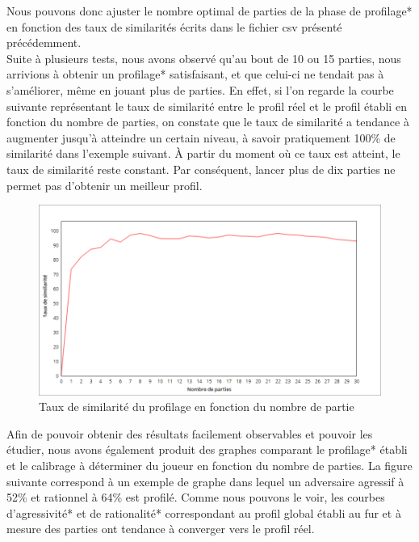 \documentclass{report}
\begin{document}
Nous pouvons donc ajuster le nombre optimal de parties de la phase de profilage* en fonction des taux de similarités écrits dans le fichier csv présenté précédemment.\\

Suite à plusieurs tests, nous avons observé qu'au bout de 10 ou 15 parties, nous arrivions à obtenir un profilage* satisfaisant, et que celui-ci ne tendait pas à s'améliorer, même en jouant plus de parties. En effet, si l'on regarde la courbe suivante représentant le taux de similarité entre le profil réel et le profil établi en fonction du nombre de parties, on constate que le taux de similarité a tendance à augmenter jusqu'à atteindre un certain niveau, à savoir pratiquement 100\% de similarité dans l'exemple suivant. À partir du moment où ce taux est atteint, le taux de similarité reste constant. Par conséquent, lancer plus de dix parties ne permet pas d'obtenir un meilleur profil. \\


\begin{figure}[H]
\hspace{-2cm}
		\includegraphics[scale=0.5]{./imagesRapport/profilageScenariosTestsAnalyseResultats.png}
	\caption{Taux de similarité du profilage en fonction du nombre de partie}
\end{figure}


Afin de pouvoir obtenir des résultats facilement observables et pouvoir les étudier, nous avons également produit des graphes comparant le profilage* établi et le calibrage à déterminer du joueur en fonction du nombre de parties. La figure suivante correspond à un exemple de graphe dans lequel un adversaire agressif à 52\% et rationnel à 64\% est profilé. Comme nous pouvons le voir, les courbes d'agressivité* et de rationalité* correspondant au profil global établi au fur et à mesure des parties ont tendance à converger vers le profil réel. \\
\end{document}

